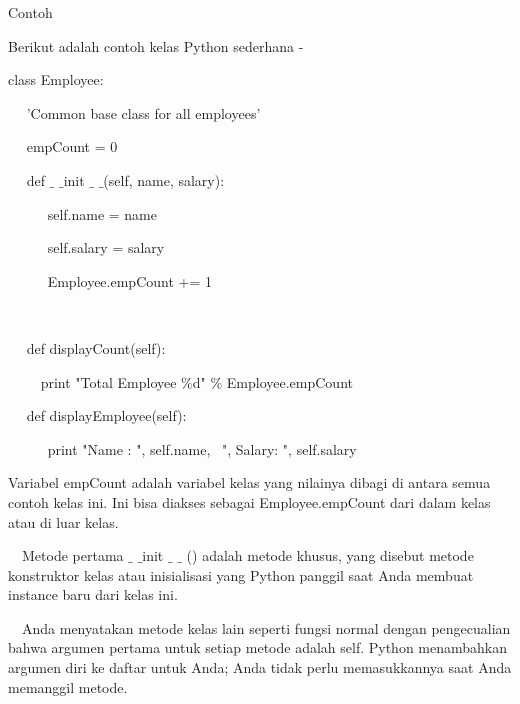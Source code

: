 \documentclass[a4paper,12pt]{report}
\begin{document}
\vspace{12pt}
\vspace{12pt}
\noindent 
Contoh \par
\vspace{12pt}
\noindent 
Berikut adalah contoh kelas Python sederhana - \par
\vspace{12pt}
\noindent 
class Employee: \par
\noindent 
~~ 'Common base class for all employees' \par
\noindent 
~~ empCount = 0 \par
\vspace{12pt}
\noindent 
~~ def  $  \_  $ $  \_  $init $  \_  $ $  \_  $(self, name, salary): \par
\noindent 
~~~~~ self.name = name \par
\noindent 
~~~~~ self.salary = salary \par
\noindent 
~~~~~ Employee.empCount += 1 \par
\noindent 
~~  \par
\noindent 
~~ def displayCount(self): \par
\noindent 
~~~~ print "Total Employee  $  \%  $d"  $  \%  $ Employee.empCount \par
\vspace{12pt}
\noindent 
~~ def displayEmployee(self): \par
\noindent 
~~~~~ print "Name : ", self.name,~ ", Salary: ", self.salary \par
\vspace{12pt}
\noindent 
Variabel empCount adalah variabel kelas yang nilainya dibagi di antara semua contoh kelas ini. Ini bisa diakses sebagai Employee.empCount dari dalam kelas atau di luar kelas. \par
\vspace{12pt}
\noindent 
 $  $ $  $ $  $ $  $Metode pertama  $  \_  $ $  \_  $init  $  \_  $ $  \_  $ () adalah metode khusus, yang disebut metode konstruktor kelas atau inisialisasi yang Python panggil saat Anda membuat instance baru dari kelas ini. \par
\vspace{12pt}
\noindent 
 $  $ $  $ $  $ $  $Anda menyatakan metode kelas lain seperti fungsi normal dengan pengecualian bahwa argumen pertama untuk setiap metode adalah self. Python menambahkan argumen diri ke daftar untuk Anda; Anda tidak perlu memasukkannya saat Anda memanggil metode. \par
\vspace{16pt}
\end{document}
